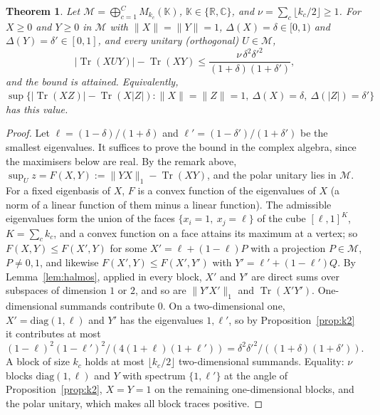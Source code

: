 \documentclass[11pt]{article}
\DeclareMathOperator{\Tr}{Tr}
\newcommand{\C}{\mathbb{C}}
\newcommand{\R}{\mathbb{R}}
\newcommand{\M}{\mathcal{M}}
\theoremstyle{plain}
\newtheorem{theorem}{Theorem}[section]
\theoremstyle{definition}
\theoremstyle{remark}
\begin{document}
\begin{theorem}\label{thm:gardner2}
Let $\M=\bigoplus_{c=1}^CM_{k_c}(\mathbb K)$, $\mathbb K\in\{\R,\C\}$, and $\nu=\sum_c\lfloor k_c/2\rfloor\ge1$. For $X\ge0$ and
$Y\ge0$ in $\M$ with $\|X\|=\|Y\|=1$, $\Delta(X)=\delta\in[0,1)$ and $\Delta(Y)=\delta'\in[0,1]$, and every unitary
(orthogonal) $U\in\M$,
\[
  |\Tr(XUY)|-\Tr(XY)\le\frac{\nu\,\delta^2\delta'^2}{(1+\delta)(1+\delta')},
\]
and the bound is attained. Equivalently, $\sup\{|\Tr(XZ)|-\Tr(X|Z|):\|X\|=\|Z\|=1,\ \Delta(X)=\delta,\ \Delta(|Z|)=\delta'\}$
has this value.
\end{theorem}
\begin{proof}
Let $\ell=(1-\delta)/(1+\delta)$ and $\ell'=(1-\delta')/(1+\delta')$ be the smallest eigenvalues. It suffices to prove the
bound in the complex algebra, since the maximisers below are real. By the remark above, $\sup_Uz=F(X,Y):=\|YX\|_1-\Tr(XY)$,
and the polar unitary lies in $\M$. For a fixed eigenbasis of $X$, $F$ is a convex function of the eigenvalues of $X$ (a
norm of a linear function of them minus a linear function). The admissible eigenvalues form the union of the faces
$\{x_i=1,\ x_j=\ell\}$ of the cube $[\ell,1]^K$, $K=\sum_ck_c$, and a convex function on a face attains its maximum at a vertex; so
$F(X,Y)\le F(X',Y)$ for some $X'=\ell+(1-\ell)P$ with a projection $P\in\M$, $P\ne0,1$, and likewise $F(X',Y)\le F(X',Y')$
with $Y'=\ell'+(1-\ell')Q$. By Lemma~\ref{lem:halmos}, applied in every block, $X'$ and $Y'$ are direct sums over subspaces of
dimension $1$ or $2$, and so are $\|Y'X'\|_1$ and $\Tr(X'Y')$. One-dimensional summands contribute $0$. On a
two-dimensional one, $X'=\mathrm{diag}(1,\ell)$ and $Y'$ has the eigenvalues $1,\ell'$, so by Proposition~\ref{prop:k2} it
contributes at most $(1-\ell)^2(1-\ell')^2/(4(1+\ell)(1+\ell'))=\delta^2\delta'^2/((1+\delta)(1+\delta'))$. A block of size
$k_c$ holds at most $\lfloor k_c/2\rfloor$ two-dimensional summands. Equality: $\nu$ blocks $\mathrm{diag}(1,\ell)$ and
$Y$ with spectrum $\{1,\ell'\}$ at the angle of Proposition~\ref{prop:k2}, $X=Y=1$ on the remaining one-dimensional blocks,
and the polar unitary, which makes all block traces positive.
\end{proof}
\end{document}
